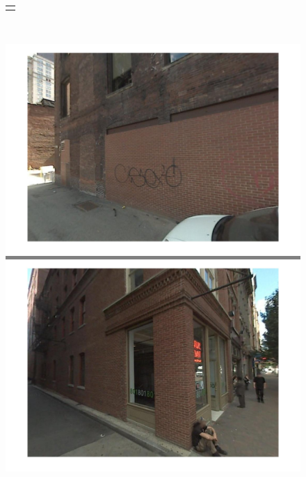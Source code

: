 \begin{figure}[!ht]
\begin{minipage}{0.93\linewidth}
\begin{tabular}{c}
		  \hline
		  \vspace{-3mm}
		\end{tabular}
	 \end{minipage}
	 \\
	 \colorbox{gray}{
		\begin{minipage}{\subw}
		  \centerline{
		  \includegraphics[width=1.05\linewidth]{imgs/aggrv/05aggrvQ.jpg}
		  }
		\end{minipage}
	 }
	 \hspace{3mm}
	 \colorbox{myRed}{
		\begin{minipage}{\subw}
		  \centerline{
		  \includegraphics[width=1.05\linewidth]{imgs/aggrv/05aggrvS.jpg}
		  }
		\end{minipage}
}
\end{figure}
